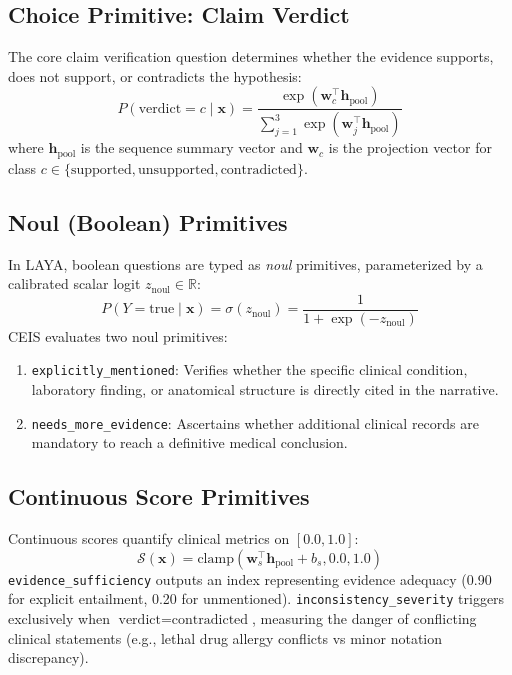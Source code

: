 \documentclass[10pt,conference]{IEEEtran}
\begin{document}
\subsection{Choice Primitive: Claim Verdict}
The core claim verification question determines whether the evidence supports, does not support, or contradicts the hypothesis:
\begin{equation}
P(\text{verdict} = c \mid \mathbf{x}) = \frac{\exp(\mathbf{w}_c^\top \mathbf{h}_{\text{pool}})}{\sum_{j=1}^3 \exp(\mathbf{w}_j^\top \mathbf{h}_{\text{pool}})}
\end{equation}
where $\mathbf{h}_{\text{pool}}$ is the sequence summary vector and $\mathbf{w}_c$ is the projection vector for class $c \in \{\text{supported}, \text{unsupported}, \text{contradicted}\}$.

\subsection{Noul (Boolean) Primitives}
In LAYA, boolean questions are typed as \textit{noul} primitives, parameterized by a calibrated scalar logit $z_{\text{noul}} \in \mathbb{R}$:
\begin{equation}
P(Y = \text{true} \mid \mathbf{x}) = \sigma(z_{\text{noul}}) = \frac{1}{1 + \exp(-z_{\text{noul}})}
\end{equation}
CEIS evaluates two noul primitives:
\begin{enumerate}
    \item \texttt{explicitly\_mentioned}: Verifies whether the specific clinical condition, laboratory finding, or anatomical structure is directly cited in the narrative.
    \item \texttt{needs\_more\_evidence}: Ascertains whether additional clinical records are mandatory to reach a definitive medical conclusion.
\end{enumerate}

\subsection{Continuous Score Primitives}
Continuous scores quantify clinical metrics on $[0.0, 1.0]$:
\begin{equation}
\mathcal{S}(\mathbf{x}) = \text{clamp}\left(\mathbf{w}_s^\top \mathbf{h}_{\text{pool}} + b_s, 0.0, 1.0\right)
\end{equation}
\texttt{evidence\_sufficiency} outputs an index representing evidence adequacy (0.90 for explicit entailment, 0.20 for unmentioned). \texttt{inconsistency\_severity} triggers exclusively when $\text{verdict} = \text{contradicted}$, measuring the danger of conflicting clinical statements (e.g., lethal drug allergy conflicts vs minor notation discrepancy).
\end{document}
